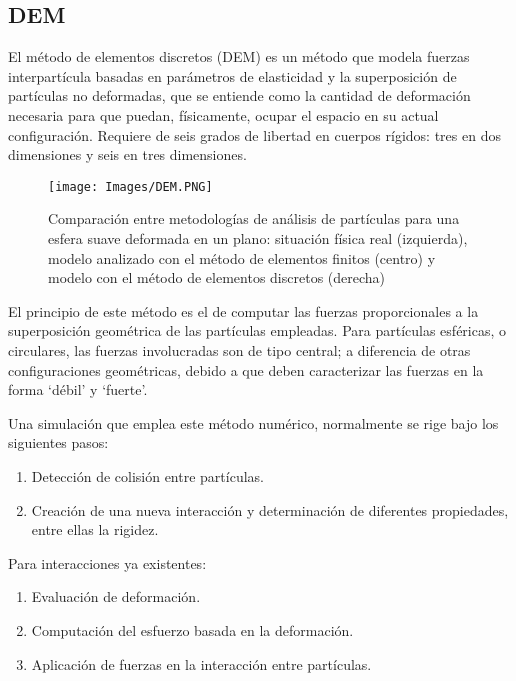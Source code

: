 \begin{center}
	\section{DEM}
\end{center}

\noindent
\justify

El m\'etodo de elementos discretos (DEM) es un m\'etodo que modela fuerzas interpart\'icula basadas en par\'ametros de elasticidad y la superposici\'on de part\'iculas no deformadas, que se entiende como la cantidad de deformaci\'on necesaria para que puedan, f\'isicamente, ocupar el espacio en su actual configuraci\'on. Requiere de seis grados de libertad en cuerpos r\'igidos: tres en dos dimensiones y seis en tres dimensiones.

\begin{figure}[h!]
	\centering
	\texttt{[image: Images/DEM.PNG]}
	\label{dem}
	\caption{Comparaci\'on entre metodolog\'ias de an\'alisis de part\'iculas para una esfera suave deformada en un plano: situaci\'on f\'isica real (izquierda), modelo analizado con el m\'etodo de elementos finitos (centro) y modelo con el m\'etodo de elementos discretos (derecha)}
\end{figure}

\noindent
\justify

El principio de este m\'etodo es el de computar las fuerzas proporcionales a la superposici\'on geom\'etrica de las part\'iculas empleadas. Para part\'iculas esf\'ericas, o circulares, las fuerzas involucradas son de tipo central; a diferencia de otras configuraciones geom\'etricas, debido a que deben caracterizar las fuerzas en la forma `d\'ebil' y `fuerte'. 

\noindent
\justify

Una simulaci\'on que emplea este m\'etodo num\'erico, normalmente se rige bajo los siguientes pasos:

\begin{enumerate}
	\item Detecci\'on de colisi\'on entre part\'iculas.
	\item Creaci\'on de una nueva interacci\'on y determinaci\'on de diferentes propiedades, entre ellas la rigidez.
\end{enumerate}

\noindent
\justify

Para interacciones ya existentes:

\begin{enumerate}
	\item Evaluaci\'on de deformaci\'on.
	\item Computaci\'on del esfuerzo basada en la deformaci\'on.
	\item Aplicaci\'on de fuerzas en la interacci\'on entre part\'iculas.
\end{enumerate}

